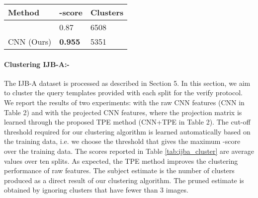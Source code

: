 \documentclass[10pt,twocolumn,letterpaper]{article}
\begin{document}
\begin{table}
\centering
\begin{tabular}{ | l | l | l|}
    \hline
    Method & -score  & Clusters \\ \hline
    \cite{msu_cluster} & 0.87 & 6508 \\ \hline
    CNN (Ours) & \textbf{0.955} & 5351\\ \hline    
\end{tabular}
    \label{tab:lfw_cluster}
    \end{table}
\begin{table}
\centering
{}
\label{tab:ijba_cluster}
\end{table} 


\paragraph{Clustering IJB-A:-}The IJB-A dataset is processed as described in Section 5. In this section, we aim to cluster the query templates provided with each split for the verify protocol. We report the results of two experiments: with the raw CNN features (CNN in Table 2) and with the projected CNN features, where the projection matrix is learned through the proposed TPE method (CNN+TPE in Table 2). The cut-off threshold required for our clustering algorithm is learned automatically based on the training data, i.e. we choose the threshold that gives the maximum -score over the training data. The scores reported in Table \ref{tab:ijba_cluster} are average values over ten splits. As expected, the TPE method improves the clustering performance of raw features. The subject estimate is the number of clusters produced as a direct result of our clustering algorithm. The pruned estimate is obtained by ignoring clusters that have fewer than 3 images. 
\end{document}

